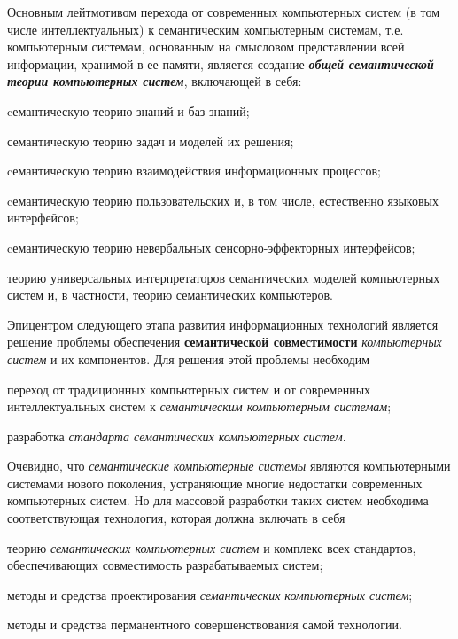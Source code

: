 \begin{SCn}
{Основным лейтмотивом перехода от современных компьютерных систем (в том числе интеллектуальных) к семантическим компьютерным системам, т.е. компьютерным системам, основанным на смысловом представлении всей информации, хранимой в ее памяти, является создание \textit{\textbf{общей семантической теории компьютерных систем}}, включающей в себя:
\begin{scnitemize}
    \item cемантическую теорию знаний и баз знаний;
    \item семантическую теорию задач и моделей их решения;
    \item cемантическую теорию взаимодействия информационных процессов;
    \item cемантическую теорию пользовательских и, в том числе, естественно языковых интерфейсов;
    \item cемантическую теорию невербальных сенсорно-эффекторных интерфейсов;
    \item теорию универсальных интерпретаторов семантических моделей компьютерных систем и, в частности, теорию семантических компьютеров.
\end{scnitemize}

Эпицентром следующего этапа развития информационных технологий является решение проблемы обеспечения \textbf{семантической совместимости} \textit{компьютерных систем} и их компонентов. Для решения этой проблемы необходим
\begin{scnitemize}
    \item переход от традиционных компьютерных систем и от современных интеллектуальных систем к \textit{семантическим компьютерным системам};
    \item разработка \textit{стандарта семантических компьютерных систем}.
\end{scnitemize}    
    
Очевидно, что \textit{семантические компьютерные системы} являются компьютерными системами нового поколения, устраняющие многие недостатки современных компьютерных систем. Но для массовой разработки таких систем необходима соответствующая технология, которая должна включать в себя  

\begin{scnitemize}        
    \item теорию \textit{семантических компьютерных систем} и комплекс всех стандартов, обеспечивающих совместимость разрабатываемых систем;
    \item методы и средства проектирования \textit{семантических компьютерных систем};
    \item методы и средства перманентного совершенствования самой технологии.
\end{scnitemize}
}


\end{SCn}
